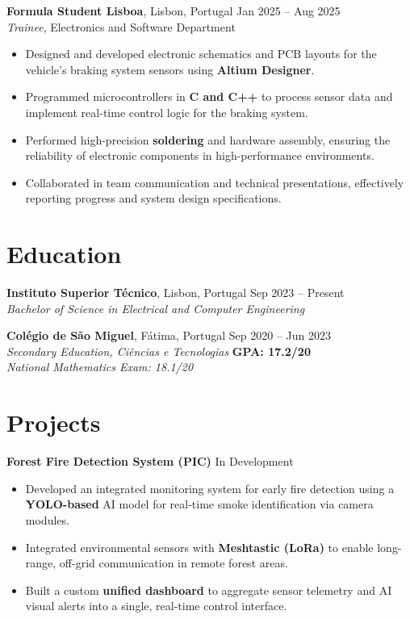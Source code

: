 \documentclass[11pt,a4paper]{article}
\begin{document}
\noindent \textbf{Formula Student Lisboa}, Lisbon, Portugal \hfill Jan 2025 -- Aug 2025 \\
\textit{Trainee}, Electronics and Software Department
\begin{itemize}[leftmargin=15pt, label={$\bullet$}]
    \item Designed and developed electronic schematics and PCB layouts for the vehicle's braking system sensors using \textbf{Altium Designer}.
    \item Programmed microcontrollers in \textbf{C and C++} to process sensor data and implement real-time control logic for the braking system.
    \item Performed high-precision \textbf{soldering} and hardware assembly, ensuring the reliability of electronic components in high-performance environments.
    \item Collaborated in team communication and technical presentations, effectively reporting progress and system design specifications.
\end{itemize}


\section*{Education}

\noindent \textbf{Instituto Superior Técnico}, Lisbon, Portugal \hfill Sep 2023 -- Present \\
\textit{Bachelor of Science in Electrical and Computer Engineering} 

\vspace{8pt}

\noindent \textbf{Colégio de São Miguel}, Fátima, Portugal \hfill Sep 2020 -- Jun 2023 \\
\textit{Secondary Education, Ciências e Tecnologias} \hfill \textbf{GPA: 17.2/20} \\
\textit{\small National Mathematics Exam: 18.1/20}

\section*{Projects}

\noindent \textbf{Forest Fire Detection System (PIC)} \hfill In Development
\begin{itemize}[leftmargin=15pt, label={$\bullet$}, noitemsep, topsep=2pt]
    \item Developed an integrated monitoring system for early fire detection using a \textbf{YOLO-based} AI model for real-time smoke identification via camera modules.
    \item Integrated environmental sensors with \textbf{Meshtastic (LoRa)} to enable long-range, off-grid communication in remote forest areas.
    \item Built a custom \textbf{unified dashboard} to aggregate sensor telemetry and AI visual alerts into a single, real-time control interface.
\end{itemize}
\end{document}
